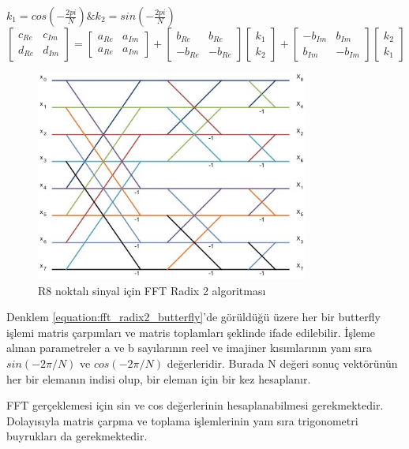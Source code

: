 $k_{1} = cos(-\frac{2pi}{N}) \& k_{2} = sin(-\frac{2pi}{N})$
\begin{equation} \label{equation:fft_radix2_butterfly}
  \begin{bmatrix}
    c_{Re} & c_{Im} \\[0.3em]
    d_{Re} & d_{Im} 
  \end{bmatrix} 
  = 
  \begin{bmatrix}
    a_{Re} & a_{Im} \\[0.3em]
    a_{Re} & a_{Im} 
  \end{bmatrix}
  +
  \begin{bmatrix}
    b_{Re} & b_{Re} \\[0.3em]
    -b_{Re} & -b_{Re} 
  \end{bmatrix}
  \begin{bmatrix}
    k_{1} \\[0.3em]
    k_{2} 
  \end{bmatrix}
  +
  \begin{bmatrix}
    -b_{Im} & b_{Im} \\[0.3em]
    b_{Im} & -b_{Im} 
  \end{bmatrix}
  \begin{bmatrix}
    k_{2} \\[0.3em]
    k_{1} 
  \end{bmatrix}
\end{equation} 

\begin{figure}[h]
\centering
\shorthandoff{=}
\includegraphics[width=0.8\textwidth]{gorsel/fft_radix2_8p.jpg}
\shorthandoff{=}
\caption{R8 noktalı sinyal için FFT Radix 2 algoritması}
\label{fft_radix2_8p}
\end{figure}
Denklem \ref{equation:fft_radix2_butterfly}'de görüldüğü üzere her bir butterfly işlemi matris çarpımları ve matris toplamları şeklinde ifade edilebilir. İşleme alınan parametreler a ve b sayılarının reel ve imajiner kısımlarının yanı sıra $sin(-2\pi/N)$ ve $cos(-2\pi/N)$ değerleridir. Burada N değeri sonuç vektörünün her bir elemanın indisi olup, bir eleman için bir kez hesaplanır. \par
FFT gerçeklemesi için sin ve cos değerlerinin hesaplanabilmesi gerekmektedir. Dolayısıyla matris çarpma ve toplama işlemlerinin yanı sıra trigonometri buyrukları da gerekmektedir.

